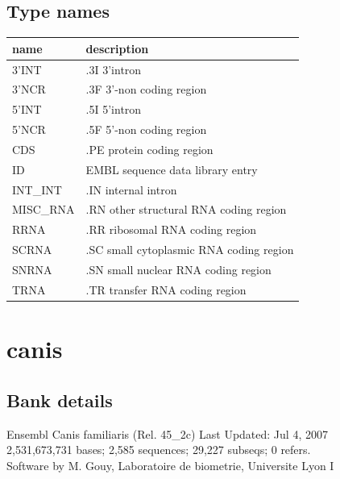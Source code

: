 \documentclass{article}
\begin{document}
\begin{Schunk}
\subsection{Type names}
\noindent\begin{tabular}{ll}
\hline \hline
name & description\\
\hline
3'INT & .3I 3'intron \\
3'NCR & .3F  3'-non coding region \\
5'INT & .5I 5'intron \\
5'NCR & .5F  5'-non coding region \\
CDS & .PE protein coding region \\
ID & EMBL sequence data library entry \\
INT\_INT & .IN  internal intron \\
MISC\_RNA & .RN other structural RNA coding region \\
RRNA & .RR ribosomal RNA coding region \\
SCRNA & .SC small cytoplasmic RNA coding region \\
SNRNA & .SN small nuclear RNA coding region \\
TRNA & .TR transfer RNA coding region \\
\hline \hline
\end{tabular}

\section{ canis }
\subsection{Bank details}
Ensembl Canis familiaris  (Rel. 45\_2c) Last Updated: Jul  4, 2007\\
2,531,673,731 bases; 2,585 sequences; 29,227 subseqs; 0 refers.\\
Software by M. Gouy, Laboratoire de biometrie, Universite Lyon I


\end{Schunk}
\end{document}
